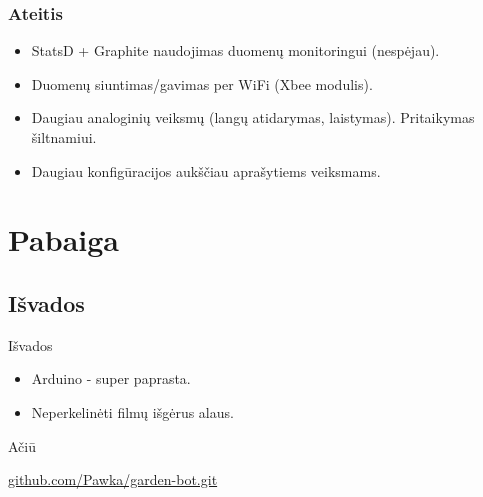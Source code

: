 \documentclass[12pt,a4paper]{beamer}
\begin{document}
\begin{frame}
    \frametitle{Ateitis}

    \begin{itemize}
        \item StatsD + Graphite naudojimas duomenų monitoringui (nespėjau).
        \item Duomenų siuntimas/gavimas per WiFi (Xbee modulis).
        \item Daugiau analoginių veiksmų (langų atidarymas, laistymas). Pritaikymas šiltnamiui.
        \item Daugiau konfigūracijos aukščiau aprašytiems veiksmams.
    \end{itemize}
    
\end{frame}

\section{Pabaiga}

\subsection{Išvados}
\begin{frame}{Išvados}
    \begin{itemize}
        \item Arduino - super paprasta.
        \item Neperkelinėti filmų išgėrus alaus.
    \end{itemize}
\end{frame}

\begin{frame}
	\begin{center}
        {\Huge Ačiū}
	\end{center}
    \begin{center}
        \href{http://github.com/Pawka/garden-bot.git}{github.com/Pawka/garden-bot.git}
    \end{center}
\end{frame}
\end{document}

